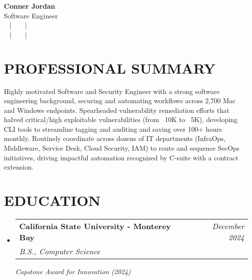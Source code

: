 \documentclass[letterpaper,10pt]{article}
\makeatletter
\newcommand{\resumeSubheading}[4]{
  \vspace{2pt}\item
    \begin{tabular*}{1.0\textwidth}[t]{l@{\extracolsep{\fill}}r}
      \textbf{#1} & \textit{#2} \\
      \textit{#3} & \textit{#4} \\
    \end{tabular*}\vspace{-4pt}
}
\newcommand{\resumeSubHeadingListStart}{\begin{itemize}[leftmargin=0.0in, label={}]}
\newcommand{\resumeSubHeadingListEnd}{\end{itemize}}
\makeatother
\begin{document}

\begin{center}
  {\Huge \textbf{Conner Jordan}}\\[4pt]
  {\Large Software Engineer}\\[4pt]
  \href{tel:+18059759793}{
    \raisebox{-0.05\height}{\faPhone\ +1 (805) 975-9793}} ~ | ~
  \href{mailto:connercharlesjordan@gmail.com}{
    \raisebox{-0.15\height}{\faEnvelope\ connercharlesjordan@gmail.com}} ~ | ~
  \raisebox{-0.15\height}{\faMapMarker\ San Luis Obispo, CA} \\
  \href{https://www.linkedin.com/in/conner-jordan-4b268514a/}{
    \raisebox{-0.15\height}{\faLinkedin\ linkedin.com/in/conner-jordan-4b268514a}} ~ | ~
  \href{https://github.com/cjordan223}{
    \raisebox{-0.15\height}{\faGithub\ github.com/cjordan223}} ~ | ~
  \href{https://connerjordan.com/}{
    \raisebox{-0.15\height}{\faGlobe\ connerjordan.com}}
\end{center}

\vspace{-12pt}

\section{PROFESSIONAL SUMMARY}
Highly motivated Software and Security Engineer with a strong software engineering background, securing and automating workflows across 2,700 Mac and Windows endpoints. Spearheaded vulnerability remediation efforts that halved critical/high exploitable vulnerabilities (from ~10K to ~5K), developing CLI tools to streamline tagging and auditing and saving over 100+ hours monthly. Routinely coordinate across dozens of IT departments (InfraOps, Middleware, Service Desk, Cloud Security, IAM) to route and sequence SecOps initiatives, driving impactful automation recognized by C-suite with a contract extension.
\vspace{-10pt}

\section{EDUCATION}
  \resumeSubHeadingListStart
    \resumeSubheading
      {California State University - Monterey Bay}{December 2024}
      {B.S., Computer Science}{\vspace{4pt}}
      {\small\textit{Capstone Award for Innovation (2024)}}{\vspace{2pt}}
  \resumeSubHeadingListEnd
\vspace{-14pt}
\end{document}
